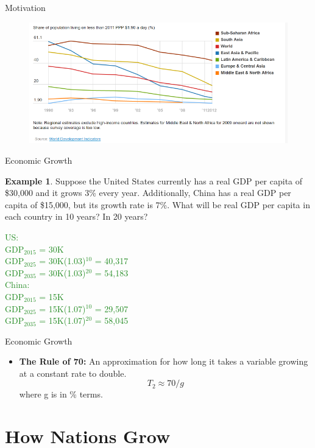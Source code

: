 \documentclass[xcolor={dvipsnames},pdf, hyperref={colorlinks=true, citecolor=ForestGreen, linkcolor=BlueViolet, urlcolor=Magenta}]{beamer}
\theoremstyle{definition}
\newtheorem{exmp}{Example}[section]
\newcommand{\defn}[1]{\textbf{#1}}
\newcommand{\ddp}[1]{{\textcolor{ForestGreen}{#1}}}
\begin{document}
\begin{frame}{Motivation}
	\begin{figure}
		\centering
		\includegraphics[scale=1.25]{04D_3}
	\end{figure}
\end{frame}


\begin{frame}{Economic Growth}
\begin{exmp} 
	
	Suppose the United States currently has a real GDP per capita of \$30,000 and it grows 3\% every year. Additionally, China has a real GDP per capita of \$15,000, but its growth rate is 7\%. What will be real GDP per capita in each country in 10 years? In 20 years?
\end{exmp}
\ddp{\pause US: \\
	GDP$_{2015}$ = 30K\\
	\pause GDP$_{2025}$ = 30K(1.03)$^{10}$ = 40,317\\
	\pause GDP$_{2035}$ = 30K(1.03)$^{20}$ = 54,183\\ 
	China: \\ 
	GDP$_{2015}$ = 15K\\
	\pause GDP$_{2025}$ = 15K(1.07)$^{10}$ = 29,507\\
	\pause GDP$_{2035}$ = 15K(1.07)$^{20}$ = 58,045}
\end{frame}

\begin{frame}{Economic Growth}
\begin{itemize}
	\item \defn{The Rule of 70:} An approximation for how long it takes a variable growing at a constant rate to double. 
	\[T_2 \approx 70/g\]
	where g is in \% terms.
\end{itemize}
\end{frame}

\section{How Nations Grow}
\end{document}
